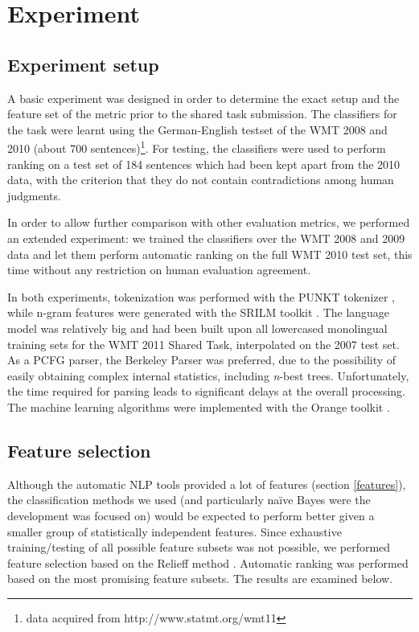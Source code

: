 \documentclass[11pt]{article}
\begin{document}
\section{Experiment}
\subsection{Experiment setup}
A basic experiment was designed in order to determine the exact setup and the
feature set of the metric prior to the shared task submission. The classifiers
for the task were learnt using the German-English testset of the \textsc{WMT}
2008 and 2010 (about 700 sentences)\footnote{data acquired from
http://www.statmt.org/wmt11}. For testing, the classifiers were used to perform
ranking on a test set of 184 sentences which had been kept apart from the 2010 data, with the criterion that
they do not contain contradictions among human judgments. 
 
In order to allow further comparison with other evaluation metrics, we
performed an extended experiment: we trained the classifiers over the
\textsc{WMT} 2008 and 2009 data and let them perform automatic ranking on the
full \textsc{WMT} 2010 test set, this time without any restriction on human
evaluation agreement.
 
In both experiments, tokenization was performed with the \textsc{PUNKT}
tokenizer \cite{Kiss_2006unsupervised,Garrette_anextensible}, while n-gram features were
generated with the \textsc{SRILM} toolkit \cite{Stolcke02srilm}.
The language model was relatively big and had been built upon all lowercased
monolingual training sets for the WMT 2011 Shared Task, interpolated on the
2007 test set. As a PCFG parser, the Berkeley Parser
\cite{Petrov07improvedinference} was preferred, due to the possibility of
easily obtaining complex internal statistics, including \textit{n}-best trees.
Unfortunately, the time required for parsing leads to significant delays at
the overall processing. The machine learning algorithms were implemented with the Orange
toolkit \cite{demsar2004orange}.

\subsection{Feature selection}
Although the automatic NLP tools provided a lot of features (section
\ref{features}), the classification methods we used (and particularly naïve
Bayes were the development was focused on) would be expected to perform better
given a smaller group of statistically independent features. Since exhaustive
training/testing of all possible feature subsets was not possible, we performed
feature selection based on the Relieff method
\cite{Kononenko94estimatingattributes:,kira1992feature}. Automatic ranking was
performed based on the most promising feature subsets. The results are examined
below. 
\end{document}
